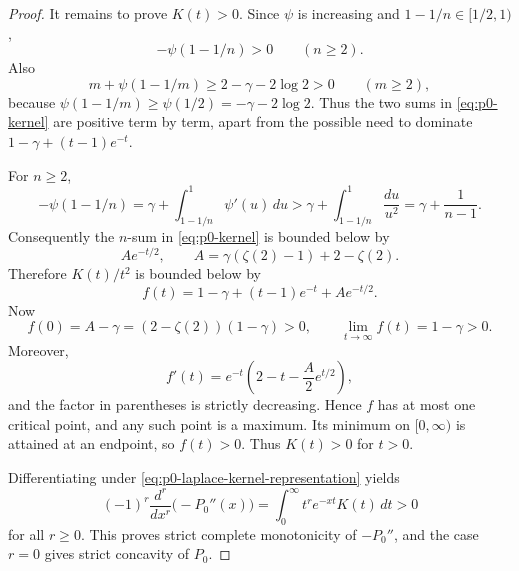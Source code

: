 \documentclass[11pt]{article}
\numberwithin{equation}{section}
\theoremstyle{definition}
\theoremstyle{remark}
\newcommand{\1}{\mathbf 1}
\begin{document}
\begin{proof}
It remains to prove \(K(t)>0\).  Since \(\psi\) is increasing and \(1-1/n\in[1/2,1)\),
\begin{equation}
\label{eq:p0-minus-psi-positive}
-\psi(1-1/n)>0\qquad(n\ge2).
\end{equation}
Also
\begin{equation}
\label{eq:p0-m-sum-positive}
m+\psi(1-1/m)\ge 2-\gamma-2\log2>0
\qquad(m\ge2),
\end{equation}
because \(\psi(1-1/m)\ge\psi(1/2)=-\gamma-2\log2\).  Thus the two sums in \eqref{eq:p0-kernel} are positive term by term, apart from the possible need to dominate \(1-\gamma+(t-1)e^{-t}\).

For \(n\ge2\),
\begin{equation}
\label{eq:p0-minus-psi-lower}
-\psi(1-1/n)
=\gamma+\int_{1-1/n}^{1}\psi'(u)\,du
>\gamma+\int_{1-1/n}^{1}\frac{du}{u^2}
=\gamma+\frac1{n-1}.
\end{equation}
Consequently the \(n\)-sum in \eqref{eq:p0-kernel} is bounded below by
\begin{equation}
\label{eq:p0-n-sum-lower}
Ae^{-t/2},
\qquad
A=\gamma(\zeta(2)-1)+2-\zeta(2).
\end{equation}
Therefore \(K(t)/t^2\) is bounded below by
\begin{equation}
\label{eq:p0-f-lower}
f(t)=1-\gamma+(t-1)e^{-t}+Ae^{-t/2}.
\end{equation}
Now
\begin{equation}
\label{eq:p0-f-endpoints}
f(0)=A-\gamma=(2-\zeta(2))(1-\gamma)>0,
\qquad
\lim_{t\to\infty}f(t)=1-\gamma>0.
\end{equation}
Moreover,
\begin{equation}
\label{eq:p0-f-derivative}
f'(t)=e^{-t}\left(2-t-\frac{A}{2}e^{t/2}\right),
\end{equation}
and the factor in parentheses is strictly decreasing.  Hence \(f\) has at most one critical point, and any such point is a maximum.  Its minimum on \([0,\infty)\) is attained at an endpoint, so \(f(t)>0\).  Thus \(K(t)>0\) for \(t>0\).

Differentiating under \eqref{eq:p0-laplace-kernel-representation} yields
\begin{equation}
\label{eq:p0-complete-monotonicity}
(-1)^r\frac{d^r}{dx^r}\bigl(-P_0''(x)\bigr)
=\int_0^\infty t^r e^{-xt}K(t)\,dt>0
\end{equation}
for all \(r\ge0\).  This proves strict complete monotonicity of \(-P_0''\), and the case \(r=0\) gives strict concavity of \(P_0\).
\end{proof}
\end{document}
